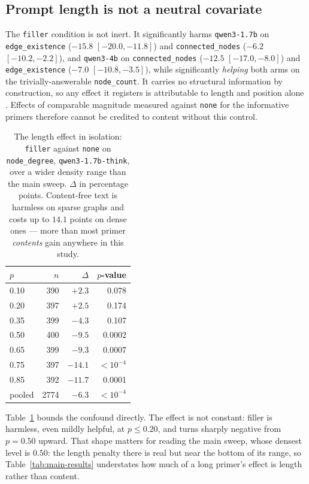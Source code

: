 \documentclass[11pt]{article}
\begin{document}
\subsection{Prompt length is not a neutral covariate}
\label{sec:results-length}

The \texttt{filler} condition is not inert. It significantly harms
\texttt{qwen3-1.7b} on \texttt{edge\_existence} ($-15.8$ $[-20.0, -11.8]$)
and \texttt{connected\_nodes} ($-6.2$ $[-10.2, -2.2]$), and
\texttt{qwen3-4b} on \texttt{connected\_nodes} ($-12.5$ $[-17.0, -8.0]$)
and \texttt{edge\_existence} ($-7.0$ $[-10.8, -3.5]$), while significantly
\emph{helping} both arms on the trivially-answerable \texttt{node\_count}.
It carries no structural information by construction, so any effect it
registers is attributable to length and position alone
\citep{liu2024lostinthemiddle,kamradt2023needle}. Effects of comparable
magnitude measured against \texttt{none} for the informative primers
therefore cannot be credited to content without this control.

\begin{table}[t]
\centering
\small
\begin{tabular}{lrrr}
\toprule
$p$ & $n$ & $\Delta$ & $p$-value \\
\midrule
0.10 & 390 & $+2.3$ & 0.078 \\
0.20 & 397 & $+2.5$ & 0.174 \\
0.35 & 399 & $-4.3$ & 0.107 \\
0.50 & 400 & $-9.5$ & 0.0002 \\
0.65 & 399 & $-9.3$ & 0.0007 \\
0.75 & 397 & $-14.1$ & $<10^{-4}$ \\
0.85 & 392 & $-11.7$ & 0.0001 \\
\midrule
pooled & 2774 & $-6.3$ & $<10^{-4}$ \\
\bottomrule
\end{tabular}
\caption{The length effect in isolation: \texttt{filler} against
\texttt{none} on \texttt{node\_degree}, \texttt{qwen3-1.7b-think}, over a
wider density range than the main sweep. $\Delta$ in percentage points.
Content-free text is harmless on sparse graphs and costs up to $14.1$
points on dense ones --- more than most primer \emph{contents} gain
anywhere in this study.}
\label{tab:filler}
\end{table}

Table~\ref{tab:filler} bounds the confound directly. The effect is not
constant: filler is harmless, even mildly helpful, at $p \le 0.20$, and
turns sharply negative from $p = 0.50$ upward. That shape matters for
reading the main sweep, whose densest level is $0.50$: the length penalty
there is real but near the bottom of its range, so
Table~\ref{tab:main-results} understates how much of a long primer's effect
is length rather than content.
\end{document}

